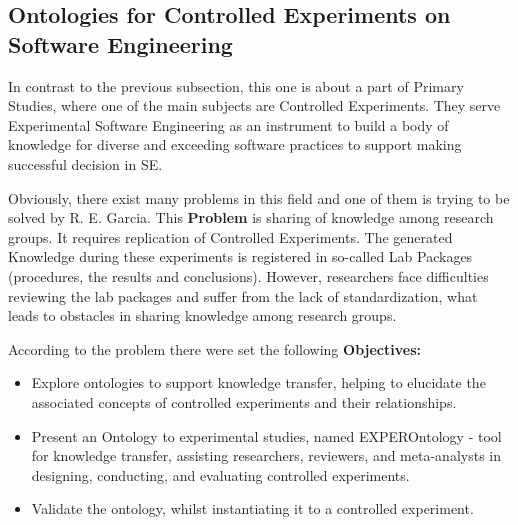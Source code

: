 	
	\subsection{Ontologies for Controlled Experiments on Software Engineering}
	In contrast to the previous subsection, this one is about a part of Primary Studies, where one of the main subjects are Controlled Experiments. They serve Experimental Software Engineering as an instrument to build a body of knowledge for diverse and exceeding software practices to support making successful decision in SE. \newline
	
	Obviously, there exist many problems in this field and one of them is trying to be solved by R. E. Garcia\cite{Gar08}. This \textbf{Problem} is sharing of knowledge among research groups. It requires replication of Controlled Experiments. The generated Knowledge during these experiments is registered in so-called Lab Packages (procedures, the results and conclusions). However, researchers face difficulties reviewing the lab packages and suffer from the lack of standardization, what leads to obstacles in sharing knowledge among research groups. \newline
	
	According to the problem there were set the following \textbf{Objectives:}
		\begin{itemize}
			\item Explore ontologies to support knowledge transfer,
			helping to elucidate the associated concepts of controlled
			experiments and their relationships.
			\item Present an Ontology to experimental studies, named EXPEROntology - tool
			for knowledge transfer, assisting researchers, reviewers,
			and meta-analysts in designing, conducting, and evaluating
			controlled experiments.
			\item Validate the ontology, whilst instantiating it to a controlled experiment.
		\end{itemize}
	  
